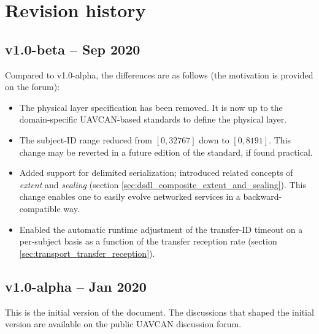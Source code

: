 \section{Revision history}

\subsection{v1.0-beta -- Sep 2020}

Compared to v1.0-alpha, the differences are as follows (the motivation is provided on the forum):

\begin{itemize}
    \item The physical layer specification has been removed.
          It is now up to the domain-specific UAVCAN-based standards to define the physical layer.

    \item The subject-ID range reduced from $[0, 32767]$ down to $[0, 8191]$.
          This change may be reverted in a future edition of the standard, if found practical.

    \item Added support for delimited serialization; introduced related concepts of \emph{extent} and \emph{sealing}
          (section \ref{sec:dsdl_composite_extent_and_sealing}).
          This change enables one to easily evolve networked services in a backward-compatible way.

    \item Enabled the automatic runtime adjustment of the transfer-ID timeout on a per-subject basis
          as a function of the transfer reception rate (section \ref{sec:transport_transfer_reception}).
\end{itemize}

\subsection{v1.0-alpha -- Jan 2020}

This is the initial version of the document.
The discussions that shaped the initial version are available on the public UAVCAN discussion forum.
